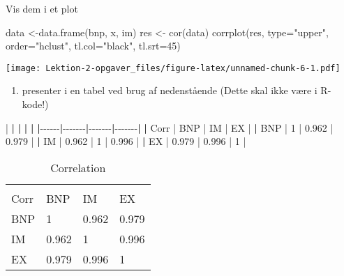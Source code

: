 \documentclass[
  12pt,
]{article}
\newenvironment{Shaded}{\begin{snugshade}}{\end{snugshade}}
\newcommand{\AttributeTok}[1]{\textcolor[rgb]{0.77,0.63,0.00}{#1}}
\newcommand{\DecValTok}[1]{\textcolor[rgb]{0.00,0.00,0.81}{#1}}
\newcommand{\ErrorTok}[1]{\textcolor[rgb]{0.64,0.00,0.00}{\textbf{#1}}}
\newcommand{\FloatTok}[1]{\textcolor[rgb]{0.00,0.00,0.81}{#1}}
\newcommand{\FunctionTok}[1]{\textcolor[rgb]{0.00,0.00,0.00}{#1}}
\newcommand{\NormalTok}[1]{#1}
\newcommand{\OtherTok}[1]{\textcolor[rgb]{0.56,0.35,0.01}{#1}}
\newcommand{\SpecialCharTok}[1]{\textcolor[rgb]{0.00,0.00,0.00}{#1}}
\newcommand{\StringTok}[1]{\textcolor[rgb]{0.31,0.60,0.02}{#1}}
\providecommand{\tightlist}{%
  \setlength{\itemsep}{0pt}\setlength{\parskip}{0pt}}
\begin{document}
Vis dem i et plot

\begin{Shaded}
\begin{Highlighting}[]
\NormalTok{data }\OtherTok{\textless{}{-}}\FunctionTok{data.frame}\NormalTok{(bnp, x, im)}
\NormalTok{res }\OtherTok{\textless{}{-}} \FunctionTok{cor}\NormalTok{(data)}
\FunctionTok{corrplot}\NormalTok{(res, }\AttributeTok{type=}\StringTok{"upper"}\NormalTok{, }\AttributeTok{order=}\StringTok{"hclust"}\NormalTok{, }\AttributeTok{tl.col=}\StringTok{"black"}\NormalTok{, }\AttributeTok{tl.srt=}\DecValTok{45}\NormalTok{)}
\end{Highlighting}
\end{Shaded}

\texttt{[image: Lektion-2-opgaver\_files/figure-latex/unnamed-chunk-6-1.pdf]}

\begin{enumerate}
\def\labelenumi{\arabic{enumi}.}
\setcounter{enumi}{1}
\tightlist
\item
  presenter i en tabel ved brug af nedenstående (Dette skal ikke være i
  R-kode!)
\end{enumerate}

\begin{Shaded}
\begin{Highlighting}[]
\SpecialCharTok{|}      \ErrorTok{|}       \ErrorTok{|}       \ErrorTok{|}       \ErrorTok{|}
\ErrorTok{|}\SpecialCharTok{{-}{-}{-}{-}{-}{-}}\ErrorTok{|}\SpecialCharTok{{-}{-}{-}{-}{-}{-}{-}}\ErrorTok{|}\SpecialCharTok{{-}{-}{-}{-}{-}{-}{-}}\ErrorTok{|}\SpecialCharTok{{-}{-}{-}{-}{-}{-}{-}}\ErrorTok{|}
\ErrorTok{|}\NormalTok{ Corr }\SpecialCharTok{|}\NormalTok{ BNP   }\SpecialCharTok{|}\NormalTok{ IM    }\SpecialCharTok{|}\NormalTok{ EX    }\SpecialCharTok{|}
\ErrorTok{|}\NormalTok{ BNP  }\SpecialCharTok{|} \DecValTok{1}     \SpecialCharTok{|} \FloatTok{0.962} \SpecialCharTok{|} \FloatTok{0.979} \SpecialCharTok{|}
\ErrorTok{|}\NormalTok{ IM   }\SpecialCharTok{|} \FloatTok{0.962} \SpecialCharTok{|} \DecValTok{1}     \SpecialCharTok{|} \FloatTok{0.996} \SpecialCharTok{|}
\ErrorTok{|}\NormalTok{ EX   }\SpecialCharTok{|} \FloatTok{0.979} \SpecialCharTok{|} \FloatTok{0.996} \SpecialCharTok{|} \DecValTok{1}     \SpecialCharTok{|}
\end{Highlighting}
\end{Shaded}

\begin{longtable}[]{@{}llll@{}}
\caption{Correlation}\tabularnewline
\toprule
& & & \\
\midrule
\endfirsthead
\toprule
& & & \\
\midrule
\endhead
Corr & BNP & IM & EX \\
BNP & 1 & 0.962 & 0.979 \\
IM & 0.962 & 1 & 0.996 \\
EX & 0.979 & 0.996 & 1 \\
\bottomrule
\end{longtable}
\end{document}
